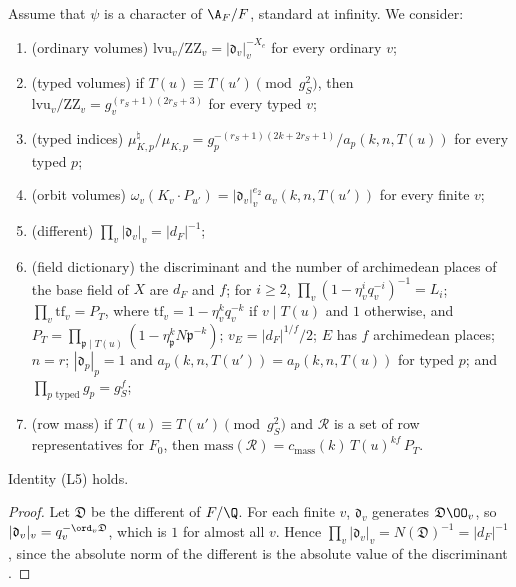 \begin{definition}\label{pf:multnc:def-localids}
Assume that $\psi$ is a character of $\A_F/F$, standard at infinity. We consider:
\begin{enumerate}[label=(L\arabic*)]
\item (ordinary volumes) $\mathrm{lvu}_v/\mathrm{ZZ}_v=|\mathfrak d_v|_v^{-X_e}$ for every ordinary $v$;
\item (typed volumes) if $T(u)\equiv T(u')\pmod{g_S^2}$, then $\mathrm{lvu}_v/\mathrm{ZZ}_v=g_v^{(r_S+1)(2r_S+3)}$ for every
typed $v$;
\item (typed indices) $\mu^\natural_{K,p}/\mu_{K,p}=g_p^{-(r_S+1)(2k+2r_S+1)}/a_p(k,n,T(u))$ for every typed $p$;
\item (orbit volumes) $\omega_v(K_v\cdot P_{u'})=|\mathfrak d_v|_v^{e_2}\,a_v(k,n,T(u'))$ for every finite $v$;
\item (different) $\prod_v|\mathfrak d_v|_v=|d_F|^{-1}$;
\item (field dictionary) the discriminant and the number of archimedean places of the base field of $X$ are $d_F$ and $f$;
for $i\ge2$, $\prod_v(1-\eta_v^iq_v^{-i})^{-1}=L_i$; $\prod_v\mathrm{tf}_v=P_T$, where $\mathrm{tf}_v=1-\eta_v^kq_v^{-k}$ if
$v\mid T(u)$ and $1$ otherwise, and $P_T=\prod_{\mathfrak p\mid T(u)}(1-\eta_{\mathfrak p}^kN\mathfrak p^{-k})$;
$v_E=|d_F|^{1/f}/2$; $E$ has $f$ archimedean places; $n=r$; $|\mathfrak d_p|_p=1$ and $a_p(k,n,T(u'))=a_p(k,n,T(u))$ for
typed $p$; and $\prod_{p\text{ typed}}g_p=g_S^{f}$;
\item (row mass) if $T(u)\equiv T(u')\pmod{g_S^2}$ and $\mathcal R$ is a set of row representatives for $F_0$, then
$\mathrm{mass}(\mathcal R)=c_{\mathrm{mass}}(k)\,T(u)^{kf}\,P_T$.
\end{enumerate}
\end{definition}

\begin{lemma}\label{pf:multnc:different}
Identity (L5) holds.
\end{lemma}

\begin{proof}
Let $\mathfrak D$ be the different of $F/\Q$. For each finite $v$, $\mathfrak d_v$ generates $\mathfrak D\OO_v$, so
$|\mathfrak d_v|_v=q_v^{-\ord_v\mathfrak D}$, which is $1$ for almost all $v$. Hence
$\prod_v|\mathfrak d_v|_v=N(\mathfrak D)^{-1}=|d_F|^{-1}$, since the absolute norm of the different is the absolute value
of the discriminant \cite[III.2.9]{Neukirch1999}.
\end{proof}

